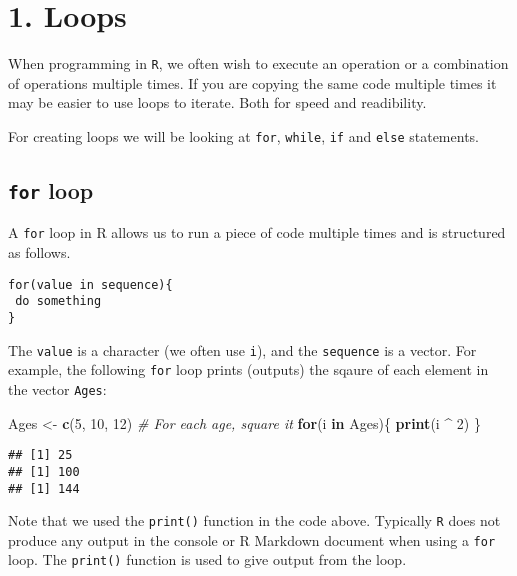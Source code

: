 \documentclass[
]{article}
\newenvironment{Shaded}{\begin{snugshade}}{\end{snugshade}}
\newcommand{\CommentTok}[1]{\textcolor[rgb]{0.56,0.35,0.01}{\textit{#1}}}
\newcommand{\ControlFlowTok}[1]{\textcolor[rgb]{0.13,0.29,0.53}{\textbf{#1}}}
\newcommand{\DecValTok}[1]{\textcolor[rgb]{0.00,0.00,0.81}{#1}}
\newcommand{\KeywordTok}[1]{\textcolor[rgb]{0.13,0.29,0.53}{\textbf{#1}}}
\newcommand{\NormalTok}[1]{#1}
\newcommand{\OperatorTok}[1]{\textcolor[rgb]{0.81,0.36,0.00}{\textbf{#1}}}
\newcommand{\StringTok}[1]{\textcolor[rgb]{0.31,0.60,0.02}{#1}}
\begin{document}
\hypertarget{loops}{%
\section{1. Loops}\label{loops}}

When programming in \texttt{R}, we often wish to execute an operation or
a combination of operations multiple times. If you are copying the same
code multiple times it may be easier to use loops to iterate. Both for
speed and readibility.

For creating loops we will be looking at \texttt{for}, \texttt{while},
\texttt{if} and \texttt{else} statements.

\hypertarget{for-loop}{%
\subsection{\texorpdfstring{\texttt{for}
loop}{for loop}}\label{for-loop}}

A \texttt{for} loop in R allows us to run a piece of code multiple times
and is structured as follows.

\begin{verbatim}
for(value in sequence){
 do something 
}
\end{verbatim}

The \texttt{value} is a character (we often use \texttt{i}), and the
\texttt{sequence} is a vector. For example, the following \texttt{for}
loop prints (outputs) the sqaure of each element in the vector
\texttt{Ages}:

\begin{Shaded}
\begin{Highlighting}[]
\NormalTok{Ages <-}\StringTok{ }\KeywordTok{c}\NormalTok{(}\DecValTok{5}\NormalTok{, }\DecValTok{10}\NormalTok{, }\DecValTok{12}\NormalTok{) }
\CommentTok{# For each age, square it}
\ControlFlowTok{for}\NormalTok{(i }\ControlFlowTok{in}\NormalTok{ Ages)\{}
  \KeywordTok{print}\NormalTok{(i }\OperatorTok{^}\StringTok{ }\DecValTok{2}\NormalTok{)}
\NormalTok{\}}
\end{Highlighting}
\end{Shaded}

\begin{verbatim}
## [1] 25
## [1] 100
## [1] 144
\end{verbatim}

Note that we used the \texttt{print()} function in the code above.
Typically \texttt{R} does not produce any output in the console or R
Markdown document when using a \texttt{for} loop. The \texttt{print()}
function is used to give output from the loop.
\end{document}
